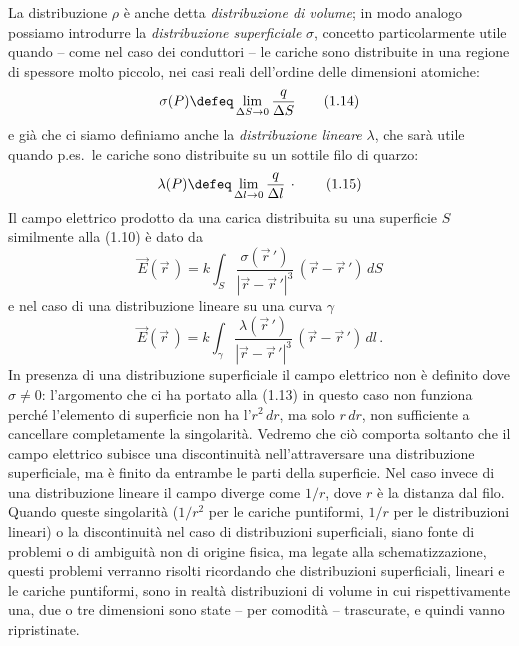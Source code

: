 La distribuzione $\rho$ \`e anche detta \emph{distribuzione di volume}; in modo
analogo possiamo introdurre la \emph{distribuzione superficiale} $\sigma$,
concetto particolarmente utile quando -- come nel caso dei conduttori -- le
cariche sono distribuite in una regione di spessore molto piccolo, nei casi
reali dell'ordine delle dimensioni atomiche:
\begin{equation}
  \sigma(P)\defeq\lim_{\Delta S\to0}\frac{q}{\Delta S}
  \tag{1.14}
\end{equation}
e gi\`a che ci siamo definiamo anche la \emph{distribuzione lineare} $\lambda$,
che sar\`a utile quando p.es.\ le cariche sono distribuite su un sottile filo di
quarzo:
\begin{equation}
  \lambda(P)\defeq\lim_{\Delta l\to0}\frac{q}{\Delta l}\,\cdot
  \tag{1.15}
\end{equation}
Il campo elettrico prodotto da una carica distribuita su una superficie $S$
similmente alla (1.10) \`e dato da
\begin{equation}
  \vec E(\vec r\,)=k\int_S\frac{\sigma(\vec r\,')}{|\vec r-\vec r\,'|^3}
  \,(\vec r-\vec r\,')\,dS
  \tag{1.16}
\end{equation}
e nel caso di una distribuzione lineare su una curva $\gamma$
\begin{equation}
  \vec E(\vec r\,)=k\int_\gamma\frac{\lambda(\vec r\,')}{|\vec r-\vec r\,'|^3}
  \,(\vec r-\vec r\,')\,dl\,.
  \tag{1.17}
\end{equation}
In presenza di una distribuzione superficiale il campo elettrico non \`e
definito dove $\sigma\neq0$: l'argomento che ci ha portato alla (1.13) in questo
caso non funziona perch\'e l'elemento di superficie non ha l'$r^2\,dr$, ma solo
$r\,dr$, non sufficiente a cancellare completamente la singolarit\`a. Vedremo
che ci\`o comporta soltanto che il campo elettrico subisce una discontinuit\`a
nell'attraversare una distribuzione superficiale, ma \`e finito da entrambe le
parti della superficie. Nel caso invece di una distribuzione lineare il campo
diverge come $1/r$, dove $r$ \`e la distanza dal filo. Quando queste
singolarit\`a ($1/r^2$ per le cariche puntiformi, $1/r$ per le distribuzioni
lineari) o la discontinuit\`a nel caso di distribuzioni superficiali, siano
fonte di problemi o di ambiguit\`a non di origine fisica, ma legate alla
schematizzazione, questi problemi verranno risolti ricordando che distribuzioni
superficiali, lineari e le cariche puntiformi, sono in realt\`a distribuzioni di
volume in cui rispettivamente una, due o tre dimensioni sono state -- per
comodit\`a -- trascurate, e quindi vanno ripristinate.

